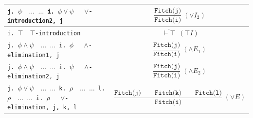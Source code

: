 \documentclass[shortabstract]{iithesis}
\theoremstyle{definition}
\theoremstyle{remark}
\theoremstyle{plain}
\begin{document}
\begin{center}
\begin{longtable}{|p{}|p{}|}
\hline


\texttt{j. $  \psi \quad  \dots$
     \newline
     $\dots$
     \newline
     i. $\phi \lor \psi \quad$ $\lor$-introduction2, j}
&
$$\displaystyle
\frac{\texttt{Fitch(j)}}{\texttt{Fitch(i)}}\;(\lor I_2)
$$
\\

\hline








\texttt{i. $\top \quad \top$-introduction}
&
$$\displaystyle
\overline{\ \vdash \top\ }\;(\top I)$$
\\

\hline


\texttt{j. $  \phi \land \psi  \quad  \dots$
     \newline
     $\dots$
     \newline
     i. $\phi \quad$ $\land$-elimination1, j}
&
$$\displaystyle
\frac{\texttt{Fitch(j)}}{\texttt{Fitch(i)}}\;(\land E_1)
$$
\\

\hline



\texttt{j. $  \phi \land \psi  \quad  \dots$
     \newline
     $\dots$
     \newline
     i. $\psi \quad$ $\land$-elimination2, j}
&
$$\displaystyle
\frac{\texttt{Fitch(j)}}{\texttt{Fitch(i)}}\;(\land E_2)
$$
\\

\hline










\texttt{j. $  \phi \lor \psi  \quad  \dots$
     \newline
     $\dots$
     \newline
     k.  $\rho  \quad  \dots$
     \newline
     $\dots$
     \newline
     l. $\rho  \quad  \dots$
     \newline
     $\dots$
     \newline     i. $\rho \quad$ $\lor$-elimination, j, k, l}
&
$$
\displaystyle
\frac{\texttt{Fitch(j)} \qquad \texttt{Fitch(k)} \qquad \texttt{Fitch(l)}}
     {\texttt{Fitch(i)}}\;(\vee E)
$$
     \\




\end{longtable}
\end{center}
\end{document}
